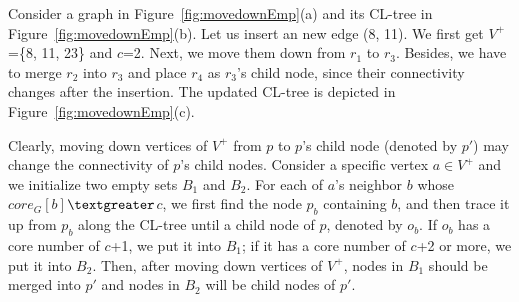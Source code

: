 \begin{example}
\label{eg:goDown}
Consider a graph in Figure~\ref{fig:movedownEmp}(a) and its CL-tree in Figure~\ref{fig:movedownEmp}(b).
Let us insert an new edge (8, 11). We first get $V^+$=\{8, 11, 23\} and $c$=2.
Next, we move them down from $r_1$ to $r_3$.
Besides, we have to merge $r_2$ into $r_3$ and place $r_4$ as $r_3$'s child node,
since their connectivity changes after the insertion.
The updated CL-tree is depicted in Figure~\ref{fig:movedownEmp}(c).
\end{example}


Clearly, moving down vertices of $V^+$ from $p$ to $p$'s child node (denoted by $p'$) may change the connectivity of $p$'s child nodes.
Consider a specific vertex $a$$\in$$V^+$ and we initialize two empty sets $B_1$ and $B_2$.
For each of $a$'s neighbor $b$ whose $core_G[b]$$\textgreater$$c$, we first find the node $p_b$ containing $b$,
and then trace it up from $p_b$ along the CL-tree until a child node of $p$, denoted by $o_b$.
If $o_b$ has a core number of $c$+1, we put it into $B_1$;
if it has a core number of $c$+2 or more, we put it into $B_2$.
Then, after moving down vertices of $V^+$,
nodes in $B_1$ should be merged into $p'$ and nodes in $B_2$ will be child nodes of $p'$.



